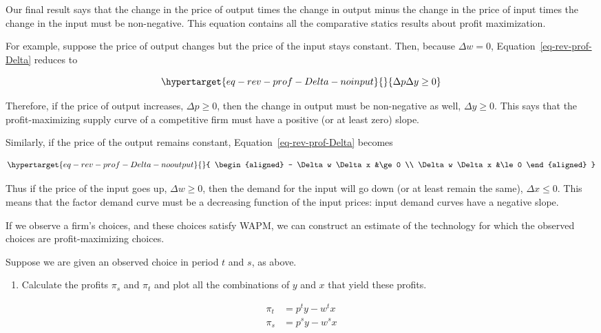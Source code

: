 \documentclass[
]{article}
\providecommand{\tightlist}{%
  \setlength{\itemsep}{0pt}\setlength{\parskip}{0pt}}\usepackage{longtable,booktabs,array}
\begin{document}
Our final result says that the change in the price of output times the
change in output minus the change in the price of input times the change
in the input must be non-negative. This equation contains all the
comparative statics results about profit maximization.

For example, suppose the price of output changes but the price of the
input stays constant. Then, because \(\Delta w = 0\),
Equation~\ref{eq-rev-prof-Delta} reduces to

\begin{equation}\protect\hypertarget{eq-rev-prof-Delta-noinput}{}{
\Delta p \Delta y \ge 0
}\label{eq-rev-prof-Delta-noinput}\end{equation}

Therefore, if the price of output increases, \(\Delta p \ge 0\), then
the change in output must be non-negative as well, \(\Delta y \ge 0\).
This says that the profit-maximizing supply curve of a competitive firm
must have a positive (or at least zero) slope.

Similarly, if the price of the output remains constant,
Equation~\ref{eq-rev-prof-Delta} becomes

\begin{equation}\protect\hypertarget{eq-rev-prof-Delta-nooutput}{}{
\begin{aligned}
 - \Delta w \Delta x &\ge 0 \\
\Delta w \Delta x &\le 0
\end{aligned}
}\label{eq-rev-prof-Delta-nooutput}\end{equation}

Thus if the price of the input goes up, \(\Delta w \ge 0\), then the
demand for the input will go down (or at least remain the same),
\(\Delta x \le 0\). This means that the factor demand curve must be a
decreasing function of the input prices: input demand curves have a
negative slope.

If we observe a firm's choices, and these choices satisfy WAPM, we can
construct an estimate of the technology for which the observed choices
are profit-maximizing choices.

Suppose we are given an observed choice in period \(t\) and \(s\), as
above.

\begin{enumerate}
\def\labelenumi{\arabic{enumi}.}
\tightlist
\item
  Calculate the profits \(\pi_s\) and \(\pi_t\) and plot all the
  combinations of \(y\) and \(x\) that yield these profits.
\end{enumerate}

\[
\begin{aligned}
\pi_t&=p^ty-w^tx \\
\pi_s&=p^sy-w^sx
\end{aligned}
\]
\end{document}
